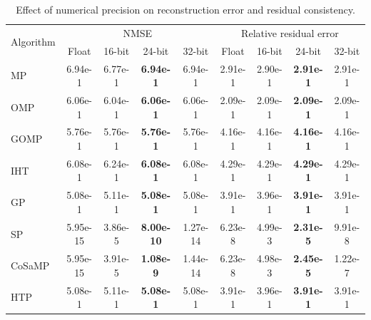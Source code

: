 ﻿\begin{table}[t]
\centering
\caption{Effect of numerical precision on reconstruction error and residual consistency.}
\label{tab:precision_study}
\scriptsize
\begin{tabular}{lcccccccc}
\hline
\multirow{2}{*}{Algorithm} & \multicolumn{4}{c}{NMSE} & \multicolumn{4}{c}{Relative residual error} \\
 & Float & 16-bit & 24-bit & 32-bit & Float & 16-bit & 24-bit & 32-bit \\
\hline
MP & 6.94e-1 & 6.77e-1 & \textbf{6.94e-1} & 6.94e-1 & 2.91e-1 & 2.90e-1 & \textbf{2.91e-1} & 2.91e-1 \\
OMP & 6.06e-1 & 6.04e-1 & \textbf{6.06e-1} & 6.06e-1 & 2.09e-1 & 2.09e-1 & \textbf{2.09e-1} & 2.09e-1 \\
GOMP & 5.76e-1 & 5.76e-1 & \textbf{5.76e-1} & 5.76e-1 & 4.16e-1 & 4.16e-1 & \textbf{4.16e-1} & 4.16e-1 \\
IHT & 6.08e-1 & 6.24e-1 & \textbf{6.08e-1} & 6.08e-1 & 4.29e-1 & 4.29e-1 & \textbf{4.29e-1} & 4.29e-1 \\
GP & 5.08e-1 & 5.11e-1 & \textbf{5.08e-1} & 5.08e-1 & 3.91e-1 & 3.96e-1 & \textbf{3.91e-1} & 3.91e-1 \\
SP & 5.95e-15 & 3.86e-5 & \textbf{8.00e-10} & 1.27e-14 & 6.23e-8 & 4.99e-3 & \textbf{2.31e-5} & 9.91e-8 \\
CoSaMP & 5.95e-15 & 3.91e-5 & \textbf{1.08e-9} & 1.44e-14 & 6.23e-8 & 4.98e-3 & \textbf{2.45e-5} & 1.22e-7 \\
HTP & 5.08e-1 & 5.11e-1 & \textbf{5.08e-1} & 5.08e-1 & 3.91e-1 & 3.96e-1 & \textbf{3.91e-1} & 3.91e-1 \\
\hline
\end{tabular}
\end{table}
